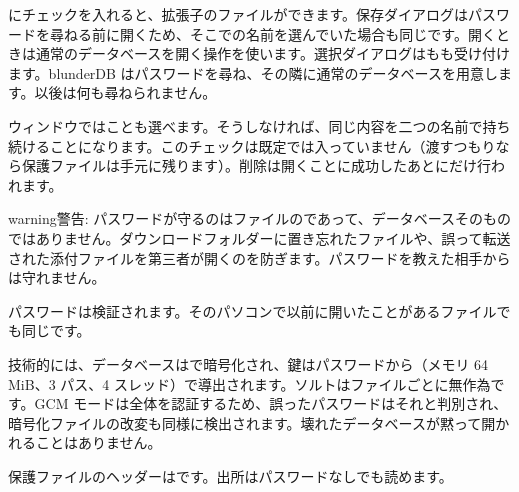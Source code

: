 \documentclass[letterpaper,10pt,dvipdfmx]{sphinxmanual}
\begin{document}
\sphinxAtStartPar
{}にチェックを入れると、拡張子のファイルができます。保存ダイアログはパスワードを尋ねる前に開くため、そこでの名前を選んでいた場合も同じです。開くときは通常のデータベースを開く操作を使います。選択ダイアログはもも受け付けます。blunderDB はパスワードを尋ね、その隣に通常のデータベースを用意します。以後は何も尋ねられません。

\sphinxAtStartPar
ウィンドウではことも選べます。そうしなければ、同じ内容を二つの名前で持ち続けることになります。このチェックは既定では入っていません（渡すつもりなら保護ファイルは手元に残ります）。削除は開くことに成功したあとにだけ行われます。

\begin{sphinxadmonition}{warning}{警告:}
\sphinxAtStartPar
パスワードが守るのはファイルのであって、データベースそのものではありません。ダウンロードフォルダーに置き忘れたファイルや、誤って転送された添付ファイルを第三者が開くのを防ぎます。パスワードを教えた相手からは守れません。
\end{sphinxadmonition}

\sphinxAtStartPar
パスワードは検証されます。そのパソコンで以前に開いたことがあるファイルでも同じです。

\sphinxAtStartPar
技術的には、データベースはで暗号化され、鍵はパスワードから（メモリ 64 MiB、3 パス、4 スレッド）で導出されます。ソルトはファイルごとに無作為です。GCM モードは全体を認証するため、誤ったパスワードはそれと判別され、暗号化ファイルの改変も同様に検出されます。壊れたデータベースが黙って開かれることはありません。

\sphinxAtStartPar
保護ファイルのヘッダーはです。出所はパスワードなしでも読めます。
\end{document}
